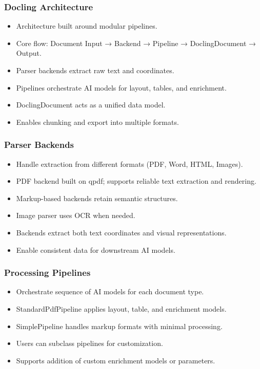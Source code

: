 \begin{frame}[fragile]\frametitle{Docling Architecture}
      \begin{itemize}
        \item Architecture built around modular pipelines.
        \item Core flow: Document Input → Backend → Pipeline → DoclingDocument → Output.
        \item Parser backends extract raw text and coordinates.
        \item Pipelines orchestrate AI models for layout, tables, and enrichment.
        \item DoclingDocument acts as a unified data model.
        \item Enables chunking and export into multiple formats.
      \end{itemize}
\end{frame}

\begin{frame}[fragile]\frametitle{Parser Backends}
      \begin{itemize}
        \item Handle extraction from different formats (PDF, Word, HTML, Images).
        \item PDF backend built on qpdf; supports reliable text extraction and rendering.
        \item Markup-based backends retain semantic structures.
        \item Image parser uses OCR when needed.
        \item Backends extract both text coordinates and visual representations.
        \item Enable consistent data for downstream AI models.
      \end{itemize}
\end{frame}

\begin{frame}[fragile]\frametitle{Processing Pipelines}
      \begin{itemize}
        \item Orchestrate sequence of AI models for each document type.
        \item StandardPdfPipeline applies layout, table, and enrichment models.
        \item SimplePipeline handles markup formats with minimal processing.
        \item Users can subclass pipelines for customization.
        \item Supports addition of custom enrichment models or parameters.
      \end{itemize}
\end{frame}

